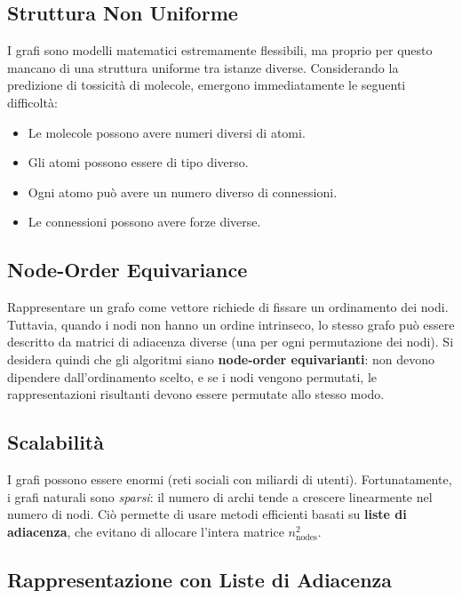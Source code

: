 \subsection{Struttura Non Uniforme}
\label{subsec:irregular-structure}

I grafi sono modelli matematici estremamente flessibili, ma proprio
per questo mancano di una struttura uniforme tra istanze diverse.
Considerando la predizione di tossicità di molecole, emergono
immediatamente le seguenti difficoltà:

\begin{itemize}
  \item Le molecole possono avere numeri diversi di atomi.
  \item Gli atomi possono essere di tipo diverso.
  \item Ogni atomo può avere un numero diverso di connessioni.
  \item Le connessioni possono avere forze diverse.
\end{itemize}

\subsection{Node-Order Equivariance}
\label{subsec:equivariance}

Rappresentare un grafo come vettore richiede di fissare un ordinamento
dei nodi. Tuttavia, quando i nodi non hanno un ordine intrinseco, lo
stesso grafo può essere descritto da matrici di adiacenza diverse (una
per ogni permutazione dei nodi). Si desidera quindi che gli algoritmi
siano \textbf{node-order equivarianti}: non devono dipendere
dall'ordinamento scelto, e se i nodi vengono permutati, le
rappresentazioni risultanti devono essere permutate allo stesso modo.

\subsection{Scalabilità}
\label{subsec:scalability}

I grafi possono essere enormi (reti sociali con miliardi di utenti).
Fortunatamente, i grafi naturali sono \emph{sparsi}: il numero di archi
tende a crescere linearmente nel numero di nodi. Ciò permette di usare
metodi efficienti basati su \textbf{liste di adiacenza}, che evitano
di allocare l'intera matrice $n_{\text{nodes}}^2$.

\subsection{Rappresentazione con Liste di Adiacenza}
\label{subsec:adjacency-list}

